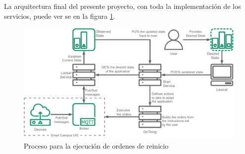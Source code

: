 La arquitectura final del presente proyecto, con toda la implementación de los servicios, puede ver se en la figura \ref{fig:StarDuckFinal}.


\begin{figure}[ht]
    \centering
    \caption{Proceso para la ejecución de ordenes de reinicio}
    \label{fig:StarDuckFinal}
    \includegraphics[width=\linewidth]{images/StarDuckFinal.pdf}
\end{figure}